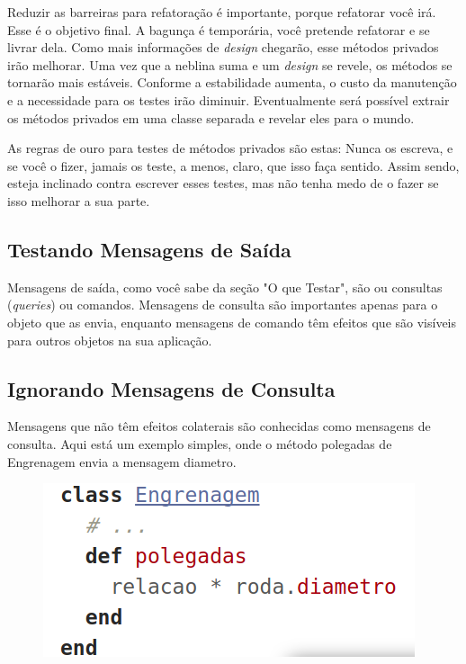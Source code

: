 Reduzir as barreiras para refatoração é importante, porque refatorar você irá.
Esse é o objetivo final. A bagunça é temporária, você pretende refatorar e se
livrar dela. Como mais informações de \textit{design} chegarão, esse métodos
privados irão melhorar. Uma vez que a neblina suma e um \textit{design} se
revele, os métodos se tornarão mais estáveis. Conforme a estabilidade aumenta,
o custo da manutenção e a necessidade para os testes irão diminuir.
Eventualmente será possível extrair os métodos privados em uma classe separada
e revelar eles para o mundo.

As regras de ouro para testes de métodos privados são estas: Nunca os escreva, e
se você o fizer, jamais os teste, a menos, claro, que isso faça sentido.
Assim sendo, esteja inclinado contra escrever esses testes, mas não tenha medo
de o fazer se isso melhorar a sua parte.

\subsection{ Testando Mensagens de Saída }

Mensagens de saída, como você sabe da seção "O que Testar", são ou consultas
(\textit{queries}) ou comandos. Mensagens de consulta são importantes apenas
para o objeto que as envia, enquanto mensagens de comando têm efeitos que são
visíveis para outros objetos na sua aplicação.

\subsection{ Ignorando Mensagens de Consulta }

Mensagens que não têm efeitos colaterais são conhecidas como mensagens de
consulta. Aqui está um exemplo simples, onde o método polegadas de Engrenagem
envia a mensagem diametro.

\begin{figure}[!htbp]
  \center
  \includegraphics[scale=0.50]{imagens/codigo_pag_215.png}
  \label{img:codigo_pag_215}
\end{figure}

